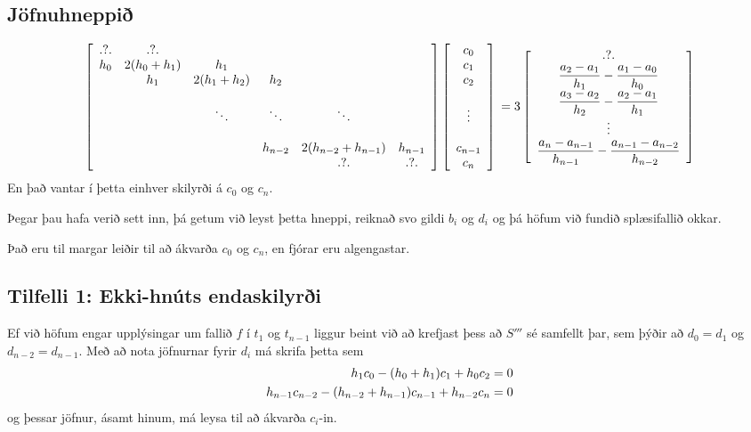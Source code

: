 \documentclass[letterpaper,10pt,icelandic]{sphinxmanual}
\begin{document}
\subsection{Jöfnuhneppið}
\label{kafli03:jofnuhneppi}\[
\left[ \begin{array}{cccccc}
.\text{?}.  & .\text{?}.       &&&& \\ 
h_0 & 2(h_0+h_1) & h_1 &&&\\
& h_1        & 2(h_1+h_2) & h_2 &&\\
&&&&&\\
&            & \ddots      & \ddots & \ddots &\\
&&&&&\\
&  &  & h_{n-2}  & 2(h_{n-2} + h_{n-1}) & h_{n-1}
\\ 
&  &  &   & .?.    & .?.
\end{array} \right]
\left[ \begin{array}{c}
c_0 \\ 
c_1 \\
c_2 \\
\\
\vdots \\
\\
c_{n-1} \\ 
c_n
\end{array} \right]
\\
= 3\left[ \begin{array}{c}
.?. \\
\dfrac{a_2-a_1}{h_1} - \dfrac{a_1-a_0}{h_0} \\
\dfrac{a_3-a_2}{h_2} - \dfrac{a_2-a_1}{h_1} \\
\vdots \\
\dfrac{a_n-a_{n-1}}{h_{n-1}}
- \dfrac{a_{n-1}-a_{n-2}}{h_{n-2}}
\\ 
\end{array} \right]\]
En það vantar í þetta einhver skilyrði á \(c_0\) og \(c_n\).

Þegar þau hafa verið sett inn, þá getum við leyst þetta hneppi, reiknað svo
gildi \(b_i\) og \(d_i\) og þá höfum við fundið splæsifallið
okkar.

Það eru til margar leiðir til að ákvarða \(c_0\) og \(c_n\), en
fjórar eru algengastar.


\subsection{Tilfelli 1: Ekki-hnúts endaskilyrði}
\label{kafli03:tilfelli-1-ekki-hnuts-endaskilyri}
Ef við höfum engar upplýsingar um fallið \(f\) í \(t_1\) og
\(t_{n-1}\) liggur beint við að krefjast þess að \(S'''\) sé
samfellt þar, sem þýðir að \(d_0 = d_1\) og
\(d_{n-2} = d_{n-1}\). Með að nota jöfnurnar fyrir \(d_i\) má
skrifa þetta sem
\begin{gather}
\begin{split}\begin{aligned}
    h_1c_0 - (h_0 + h_1)c_1 + h_0c_2 = 0 \\
    h_{n-1}c_{n-2}-(h_{n-2}+h_{n-1})c_{n-1}+h_{n-2}c_n = 0\end{aligned}\end{split}\notag
\end{gather}
og þessar jöfnur, ásamt hinum, má leysa til að ákvarða \(c_i\)-in.
\end{document}
